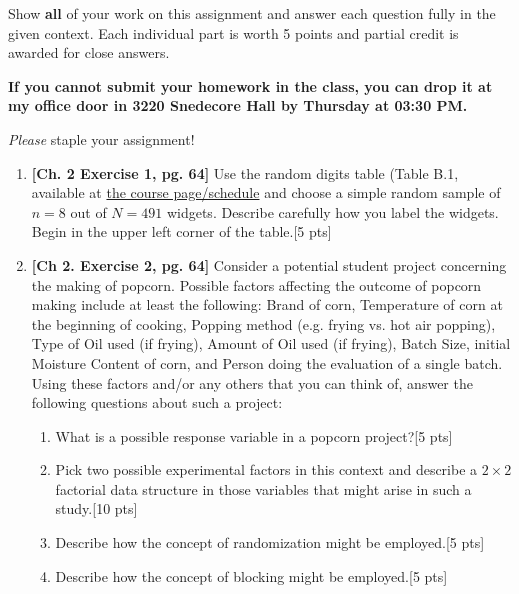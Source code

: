 \documentclass[11pt]{article}\usepackage[]{graphicx}\usepackage[]{color}
\begin{document}

\pagestyle{fancy} 

Show \textbf{all} of your work on this assignment and answer each question fully in the given context. 
Each individual part is worth 5 points and partial credit is awarded for close answers.
\vspace{0.3cm}

\textbf{If you cannot submit your homework in the class, you can drop it at my office door in 3220 Snedecore Hall by Thursday at 03:30 PM.}

\vspace{0.3cm}
\emph{Please} staple your assignment!

\begin{enumerate}

\item \textbf{[Ch. 2 Exercise 1, pg. 64]} Use the random digits table (Table B.1, available at \href{https://ashirazist.github.io/stat305_s2020.github.io/schedule.html}{the course page/schedule} and choose a simple random sample of $n = 8$ out of $N = 491$ widgets. Describe carefully how you label the widgets. Begin in the upper left corner of the table.[5 pts] 
\item \textbf{[Ch 2. Exercise 2, pg. 64]} Consider a potential student project concerning the making of popcorn. Possible factors affecting the outcome of popcorn making include at least the following: Brand of corn, Temperature of corn at the beginning of cooking, Popping method (e.g. frying vs. hot air popping), Type of Oil used (if frying), Amount of Oil used (if frying), Batch Size, initial Moisture Content of corn, and Person doing the evaluation of a single batch. Using these factors and/or any others that you can think of, answer the following questions about such a project:

      \begin{enumerate}
          \item What is a possible response variable in a popcorn project?[5 pts]
          \item Pick two possible experimental factors in this context and describe a $2 \times 2$ factorial data structure in those variables that might arise in such a study.[10 pts]
          \item Describe how the concept of randomization might be employed.[5 pts]
          \item Describe how the concept of blocking might be employed.[5 pts]
      \end{enumerate}
      

\end{enumerate}
\end{document}

